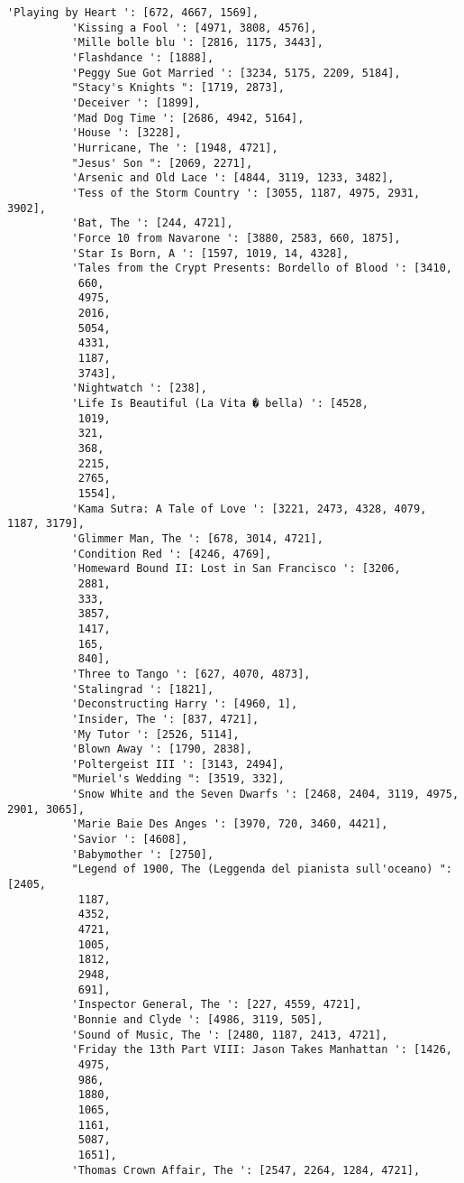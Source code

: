 \documentclass[11pt]{article}
\begin{document}
\begin{Verbatim}[commandchars=\\\{\}]
          'Playing by Heart ': [672, 4667, 1569],
          'Kissing a Fool ': [4971, 3808, 4576],
          'Mille bolle blu ': [2816, 1175, 3443],
          'Flashdance ': [1888],
          'Peggy Sue Got Married ': [3234, 5175, 2209, 5184],
          "Stacy's Knights ": [1719, 2873],
          'Deceiver ': [1899],
          'Mad Dog Time ': [2686, 4942, 5164],
          'House ': [3228],
          'Hurricane, The ': [1948, 4721],
          "Jesus' Son ": [2069, 2271],
          'Arsenic and Old Lace ': [4844, 3119, 1233, 3482],
          'Tess of the Storm Country ': [3055, 1187, 4975, 2931, 3902],
          'Bat, The ': [244, 4721],
          'Force 10 from Navarone ': [3880, 2583, 660, 1875],
          'Star Is Born, A ': [1597, 1019, 14, 4328],
          'Tales from the Crypt Presents: Bordello of Blood ': [3410,
           660,
           4975,
           2016,
           5054,
           4331,
           1187,
           3743],
          'Nightwatch ': [238],
          'Life Is Beautiful (La Vita � bella) ': [4528,
           1019,
           321,
           368,
           2215,
           2765,
           1554],
          'Kama Sutra: A Tale of Love ': [3221, 2473, 4328, 4079, 1187, 3179],
          'Glimmer Man, The ': [678, 3014, 4721],
          'Condition Red ': [4246, 4769],
          'Homeward Bound II: Lost in San Francisco ': [3206,
           2881,
           333,
           3857,
           1417,
           165,
           840],
          'Three to Tango ': [627, 4070, 4873],
          'Stalingrad ': [1821],
          'Deconstructing Harry ': [4960, 1],
          'Insider, The ': [837, 4721],
          'My Tutor ': [2526, 5114],
          'Blown Away ': [1790, 2838],
          'Poltergeist III ': [3143, 2494],
          "Muriel's Wedding ": [3519, 332],
          'Snow White and the Seven Dwarfs ': [2468, 2404, 3119, 4975, 2901, 3065],
          'Marie Baie Des Anges ': [3970, 720, 3460, 4421],
          'Savior ': [4608],
          'Babymother ': [2750],
          "Legend of 1900, The (Leggenda del pianista sull'oceano) ": [2405,
           1187,
           4352,
           4721,
           1005,
           1812,
           2948,
           691],
          'Inspector General, The ': [227, 4559, 4721],
          'Bonnie and Clyde ': [4986, 3119, 505],
          'Sound of Music, The ': [2480, 1187, 2413, 4721],
          'Friday the 13th Part VIII: Jason Takes Manhattan ': [1426,
           4975,
           986,
           1880,
           1065,
           1161,
           5087,
           1651],
          'Thomas Crown Affair, The ': [2547, 2264, 1284, 4721],

\end{Verbatim}
\end{document}
